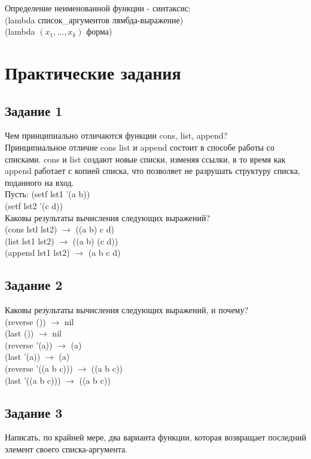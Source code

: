 Определение неименованной функции - синтаксис:\\
(lambda список\_аргументов лямбда-выражение)\\
(lambda $(x_{1}, ..., x_{k})$ форма)\\

\chapter{Практические задания}
\section{Задание 1}
Чем принципиально отличаются функции cons, list, append?\\
Принципиальное отличие cons list и append состоит в способе работы со списками. cons и list создают новые списки, изменяя ссылки, в то время как append работает с копией списка, что позволяет не разрушать структуру списка, поданного на вход.\\

Пусть:
(setf lst1 '(a b))\\
(setf lst2 '(c d))\\

Каковы результаты вычисления следующих выражений?\\
(cons lstl lst2) $\rightarrow$ ((a b) c d)\\
(list lst1 lst2) $\rightarrow$ ((a b) (c d))\\
(append lst1 lst2) $\rightarrow$ (a b c d)\\

\section{Задание 2}
Каковы результаты вычисления следующих выражений, и почему?\\
(reverse ()) $\rightarrow$ nil\\
(last ())  $\rightarrow$ nil\\
(reverse '(a))  $\rightarrow$ (a)\\
(last '(a)) $\rightarrow$ (a)\\
(reverse '((a b c))) $\rightarrow$ ((a b c))\\
(last '((a b c))) $\rightarrow$ ((a b c))\\

\section{Задание 3}
Написать, по крайней мере, два варианта функции, которая возвращает последний элемент
своего списка-аргумента.

